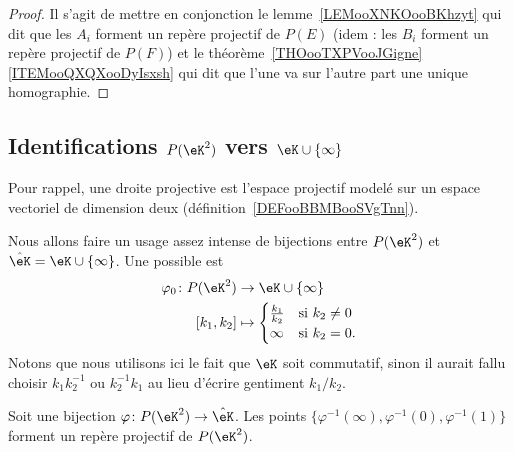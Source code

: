 \begin{proof}
	Il s'agit de mettre en conjonction le lemme~\ref{LEMooXNKOooBKhzyt} qui dit que les \( A_i\) forment un repère projectif de \( P(E)\) (idem : les \( B_i\) forment un repère projectif de \( P(F)\)) et le théorème~\ref{THOooTXPVooJGigne}\ref{ITEMooQXQXooDyIsxsh} qui dit que l'une va sur l'autre part une unique homographie.
\end{proof}

\subsection{Identifications \texorpdfstring{\(  P(\eK^2)\)}{P(K2)} vers \texorpdfstring{\(  \eK\cup\{ \infty \}\)}{K u infinity}}

Pour rappel, une droite projective est l'espace projectif modelé sur un espace vectoriel de dimension deux (définition~\ref{DEFooBBMBooSVgTnn}).

\begin{normaltext}      \label{NORMooUQRUooOMIzJD}
	Nous allons faire un usage assez intense de bijections entre \( P(\eK^2)\) et \( \hat\eK=\eK\cup\{ \infty \}\). Une possible est
	\begin{equation}        \label{EQooSIJDooTHPYMb}
		\begin{aligned}
			\varphi_0\colon P(\eK^2) & \to \eK\cup\{ \infty \}            \\
			[k_1,k_2]                & \mapsto \begin{cases}
				\frac{ k_1 }{ k_2 } & \text{si } k_2\neq 0 \\
				\infty              & \text{si } k_2=0.
			\end{cases}
		\end{aligned}
	\end{equation}
	Notons que nous utilisons ici le fait que \( \eK\) soit commutatif, sinon il aurait fallu choisir \( k_1k_2^{-1}\) ou \( k_2^{-1}k_1\) au lieu d'écrire gentiment \( k_1/k_2\).
\end{normaltext}

\begin{corollary}       \label{CORooFJSCooNOeAel}
	Soit une bijection \( \varphi\colon P(\eK^2)\to \hat\eK\). Les points \( \{ \varphi^{-1}(\infty), \varphi^{-1}(0), \varphi^{-1}(1) \}\) forment un repère projectif de \( P(\eK^2)\).
\end{corollary}

